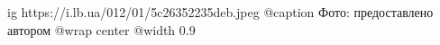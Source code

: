  
 
 
 
 

\ifcmt
  ig https://i.lb.ua/012/01/5c26352235deb.jpeg
	@caption Фото: предоставлено автором
  @wrap center
  @width 0.9
\fi
